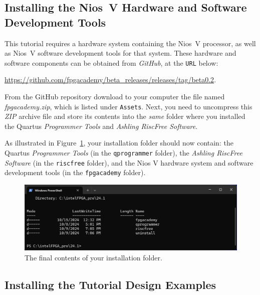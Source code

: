 \documentclass[11pt, twoside, pdftex]{article}
\begin{document}
\subsection{Installing the Nios~V Hardware and Software Development Tools}
\label{sec:hw_sw}

This tutorial requires a hardware system containing the Nios~V processor, as well as Nios~V
software development tools for that system. These hardware and software components can be
obtained from {\it GitHub}, at the \texttt{URL} below:

{\href{https://github.com/fpgacademy/beta\_releases/releases/tag/beta0.2} 
{https://github.com/fpgacademy/beta\_releases/releases/tag/beta0.2}.

From the GitHub repository download to your computer the file named {\it fpgacademy.zip}, 
which is listed under \texttt{Assets}. Next, you need to uncompress this {\it ZIP} archive 
file and store its contents into the {\it same} folder where you installed the Quartus 
{\it Programmer Tools} and {\it Ashling RiscFree Software}.

As illustrated in Figure~\ref{fig:goterdone}, your installation folder should now 
contain: the Quartus {\it Programmer Tools} (in the \texttt{qprogrammer} folder), the 
{\it Ashling RiscFree Software} (in the \texttt{riscfree} folder), and the Nios V 
hardware system and software development tools (in the \texttt{fpgacademy} folder).
~\\
\begin{figure}[h]
    \begin{center}
        \includegraphics[width=.9\linewidth]{figures/goterdone.png}
        \caption{The final contents of your installation folder.}
        \label{fig:goterdone}
    \end{center}
\end{figure}

\subsection{Installing the Tutorial Design Examples}
\label{sec:egs}

}
\end{document}
